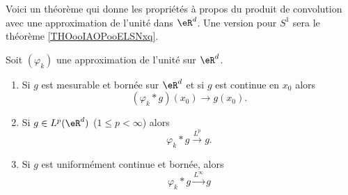 Voici un théorème qui donne les propriétés à propos du produit de convolution avec une approximation de l'unité dans \( \eR^d\). Une version pour \( S^1\) sera le théorème \ref{THOooIAOPooELSNxq}.
\begin{theorem} \label{ThoYQbqEez}
	Soit \( (\varphi_k)\) une approximation de l'unité sur \( \eR^d\).
	\begin{enumerate}
		\item
		      Si \( g\) est mesurable et bornée sur \( \eR^d\) et si \( g\) est continue en \( x_0\) alors
		      \begin{equation}
			      (\varphi_k*g)(x_0)\to g(x_0).
		      \end{equation}
		\item
		      Si \( g\in L^p(\eR^d)\) (\( 1\leq p<\infty\)) alors
		      \begin{equation}
			      \varphi_k*g\stackrel{L^p}{\to}g.
		      \end{equation}
		\item
		      Si \( g\) est uniformément continue et bornée, alors
		      \begin{equation}
			      \varphi_k*g\stackrel{L^{\infty}}{\to}g
		      \end{equation}
	\end{enumerate}
\end{theorem}

